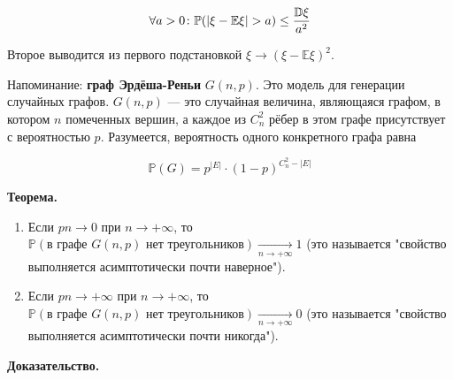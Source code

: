 \documentclass[12pt]{article}
\DeclarePairedDelimiter\autobracket{(}{)}
\newcommand{\br}[1]{\autobracket*{#1}}
\renewcommand{\P}{\mathbb{P}}
\newcommand{\E}{\mathbb{E}}
\newcommand{\D}{\mathbb{D}}
\begin{document}
\[
\forall a > 0 \colon \P \br{|\xi - \E \xi| > a} \leq \frac {\D \xi} {a^2}
\]

Второе выводится из первого подстановкой $\xi \to (\xi - \E \xi)^2$.

Напоминание: \textbf{граф Эрдёша-Реньи} $G(n, p)$. Это модель для генерации случайных графов. $G(n, p)$ — это случайная величина, являющаяся графом, в котором $n$ помеченных вершин, а каждое из $C^2_n$ рёбер в этом графе присутствует с вероятностью $p$. Разумеется, вероятность одного конкретного графа равна

\[
\P(G) = p^{|E|} \cdot (1 - p)^{C^2_n - |E|}
\]

\textbf{Теорема.}

\begin{enumerate}
\item Если $p n \to 0$ при $n \to +\infty$, то $\P(\text{в графе $G(n, p)$ нет треугольников}) \xrightarrow[n \to +\infty]{} 1$ (это называется "свойство выполняется асимптотически почти наверное").
\item Если $p n \to +\infty$ при $n \to +\infty$, то $\P(\text{в графе $G(n, p)$ нет треугольников}) \xrightarrow[n \to +\infty]{} 0$ (это называется "свойство выполняется асимптотически почти никогда").
\end{enumerate}

\textbf{Доказательство.}
\end{document}

